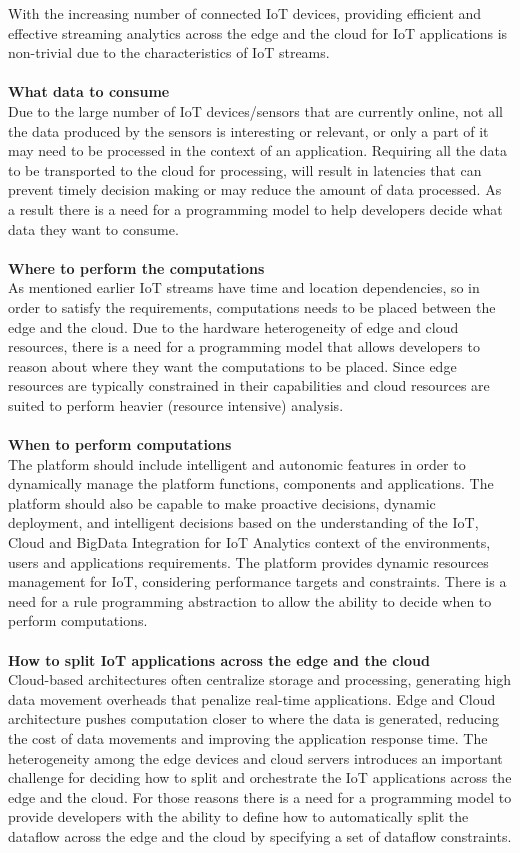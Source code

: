 With the increasing number of connected IoT devices, providing efficient and effective streaming analytics across the edge and the cloud for IoT applications is non-trivial due to the characteristics of IoT streams.
\\\\
\noindent\textbf{What data to consume}
\\
Due to the large number of IoT devices/sensors that are currently online, not all the data produced by the sensors is interesting or relevant, or only a part of it may need to be
processed in the context of an application. Requiring all the data to be transported to the
cloud for processing, will result in latencies that can prevent timely decision making or may reduce the amount of data processed. As a result there is a need for a programming model to help developers decide what data they want to consume.
\\\\
\noindent\textbf{Where to perform the computations}
\\
As mentioned earlier IoT streams have time and location dependencies, so in order to satisfy the requirements, computations needs to be placed between the edge and the cloud. Due to the hardware heterogeneity of edge and cloud resources, there is a need for a programming model that allows developers to reason about where they want the computations to be placed. Since edge resources are typically constrained in their capabilities and cloud resources are suited to perform heavier (resource intensive) analysis.
\\\\
\noindent\textbf{When to perform computations}
\\
The platform should include intelligent and autonomic features in order to dynamically manage the platform functions, components and applications. The platform should also be capable to make proactive decisions, dynamic deployment, and intelligent decisions based on the understanding of the IoT, Cloud and BigData Integration for IoT Analytics context of the environments, users and applications requirements. The platform provides dynamic resources management for IoT, considering performance targets and constraints. 
There is a need for a rule programming abstraction to allow the ability to decide when to perform computations.
\\\\
\noindent\textbf{How to split IoT applications across the edge and the cloud}
\\
Cloud-based architectures often centralize storage and processing, generating high data
movement overheads that penalize real-time applications. Edge and Cloud architecture pushes computation closer to where the data is generated, reducing the cost of data movements and improving the application response time. The heterogeneity among the edge devices and cloud servers introduces an important challenge for deciding how to split and orchestrate the IoT
applications across the edge and the cloud. For those reasons there is a need for a programming model to provide developers with the ability to define how to automatically split the dataflow across the edge and the cloud by specifying a set of dataflow constraints.

